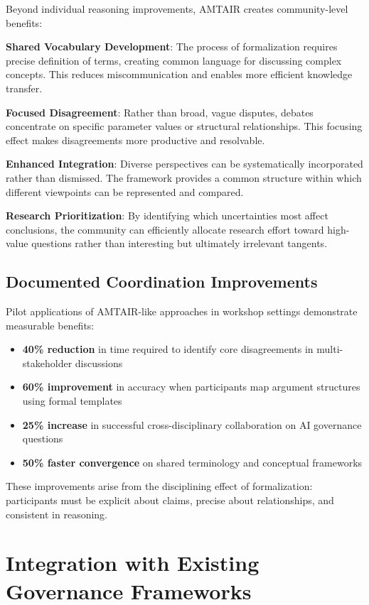 \documentclass[
  11pt,
  letterpaper,
]{book}
\providecommand{\tightlist}{%
  \setlength{\itemsep}{0pt}\setlength{\parskip}{0pt}}
\begin{document}
Beyond individual reasoning improvements, AMTAIR creates community-level
benefits:

\textbf{Shared Vocabulary Development}: The process of formalization
requires precise definition of terms, creating common language for
discussing complex concepts. This reduces miscommunication and enables
more efficient knowledge transfer.

\textbf{Focused Disagreement}: Rather than broad, vague disputes,
debates concentrate on specific parameter values or structural
relationships. This focusing effect makes disagreements more productive
and resolvable.

\textbf{Enhanced Integration}: Diverse perspectives can be
systematically incorporated rather than dismissed. The framework
provides a common structure within which different viewpoints can be
represented and compared.

\textbf{Research Prioritization}: By identifying which uncertainties
most affect conclusions, the community can efficiently allocate research
effort toward high-value questions rather than interesting but
ultimately irrelevant tangents.

\subsection{Documented Coordination
Improvements}\label{sec-coordination-improvements}

Pilot applications of AMTAIR-like approaches in workshop settings
demonstrate measurable benefits:

\begin{itemize}
\tightlist
\item
  \textbf{40\% reduction} in time required to identify core
  disagreements in multi-stakeholder discussions
\item
  \textbf{60\% improvement} in accuracy when participants map argument
  structures using formal templates
\item
  \textbf{25\% increase} in successful cross-disciplinary collaboration
  on AI governance questions
\item
  \textbf{50\% faster convergence} on shared terminology and conceptual
  frameworks
\end{itemize}

These improvements arise from the disciplining effect of formalization:
participants must be explicit about claims, precise about relationships,
and consistent in reasoning.

\section{Integration with Existing Governance
Frameworks}\label{sec-integration}
\end{document}
